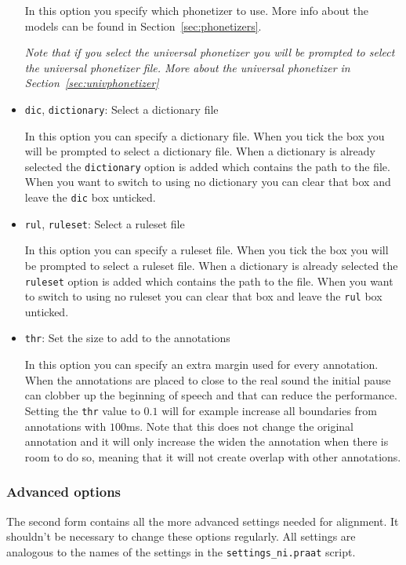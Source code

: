 \begin{itemize}
		In this option you specify which phonetizer to use. More info about the
		models can be found in Section~\ref{sec:phonetizers}.

		\emph{Note that if you select the universal phonetizer you will be prompted
		to select the universal phonetizer file. More about the universal
		phonetizer in Section~\ref{sec:univphonetizer}}
	\item \texttt{dic}, \texttt{dictionary}: %
		Select a dictionary file

		In this option you can specify a dictionary file. When you tick the box you
		will be prompted to select a dictionary file. When a dictionary is already
		selected the \texttt{dictionary} option is added which contains the path to
		the file. When you want to switch to using no dictionary you can clear that
		box and leave the \texttt{dic} box unticked.
	\item \texttt{rul}, \texttt{ruleset}: %
		Select a ruleset file

		In this option you can specify a ruleset file. When you tick the box you
		will be prompted to select a ruleset file. When a dictionary is already
		selected the \texttt{ruleset} option is added which contains the path to
		the file. When you want to switch to using no ruleset you can clear that
		box and leave the \texttt{rul} box unticked.
	\item \texttt{thr}: %
		Set the size to add to the annotations

		In this option you can specify an extra margin used for every annotation.
		When the annotations are placed to close to the real sound the initial
		pause can clobber up the beginning of speech and that can reduce the
		performance. Setting the \texttt{thr} value to $0.1$ will for example increase
		all boundaries from annotations with $100$ms. Note that this does not
		change the original annotation and it will only increase the widen the
		annotation when there is room to do so, meaning that it will not create
		overlap with other annotations.
\end{itemize}

\subsubsection{Advanced options}	
The second form contains all the more advanced settings needed for alignment.
It shouldn't be necessary to change these options regularly. All settings are
analogous to the names of the settings in the \texttt{settings\_ni.praat}
script.

